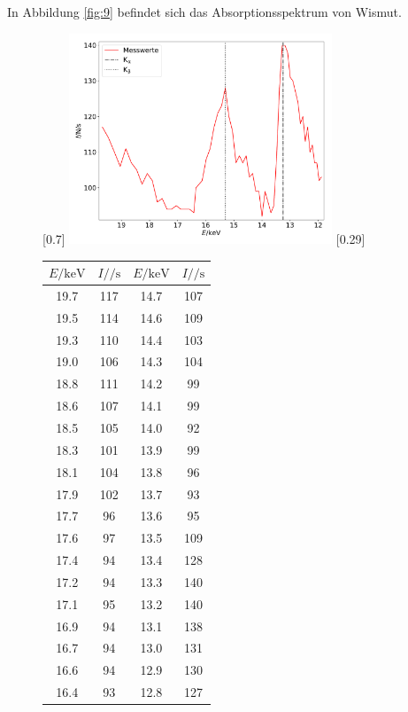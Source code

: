 In Abbildung \ref{fig:9} befindet sich das Absorptionsspektrum von Wismut.
\begin{figure}
  \centering
  [0.7\textwidth]{
  \includegraphics[width=0.7\textwidth]{wismut.pdf}
  }
  \hfill
  [0.29\textwidth]{
  \begin{tabular}{c c c c}
    \toprule
    $E / \si{\kilo\electronvolt}$ & $I / \si{\per\second}$ & $E / \si{\kilo\electronvolt}$ & $I / \si{\per\second}$ \\
    \midrule
    19.7 & 117 & 14.7 & 107 \\
    19.5 & 114 & 14.6 & 109 \\
    19.3 & 110 & 14.4 & 103 \\
    19.0 & 106 & 14.3 & 104 \\
    18.8 & 111 & 14.2 & 99 \\
    18.6 & 107 & 14.1 & 99 \\
    18.5 & 105 & 14.0 & 92 \\
    18.3 & 101 & 13.9 & 99 \\
    18.1 & 104 & 13.8 & 96 \\
    17.9 & 102 & 13.7 & 93 \\
    17.7 & 96 & 13.6 & 95 \\
    17.6 & 97 & 13.5 & 109 \\
    17.4 & 94 & 13.4 & 128 \\
    17.2 & 94 & 13.3 & 140 \\
    17.1 & 95 & 13.2 & 140 \\
    16.9 & 94 & 13.1 & 138 \\
    16.7 & 94 & 13.0 & 131 \\
    16.6 & 94 & 12.9 & 130 \\
    16.4 & 93 & 12.8 & 127 \\

\end{tabular}}
\end{figure}
